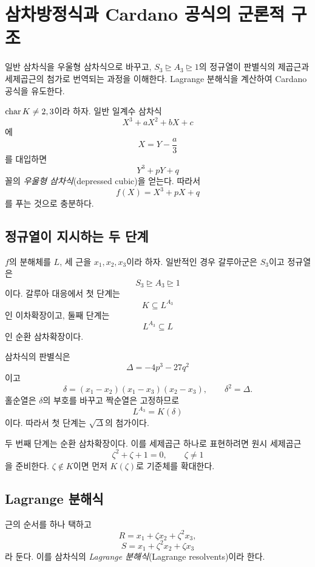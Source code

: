 \clearpage
\section{삼차방정식과 Cardano 공식의 군론적 구조}
\label{sec:cardano-galois-structure}

\begin{learninggoal}
일반 삼차식을 우울형 삼차식으로 바꾸고, $S_3\trianglerighteq A_3\trianglerighteq1$의 정규열이 판별식의 제곱근과 세제곱근의 첨가로 번역되는 과정을 이해한다. Lagrange 분해식을 계산하여 Cardano 공식을 유도한다.
\end{learninggoal}

$\operatorname{char} K\ne2,3$이라 하자. 일반 일계수 삼차식
\[
  X^3+aX^2+bX+c
\]
에
\[
  X=Y-\frac a3
\]
를 대입하면
\[
  Y^3+pY+q
\]
꼴의 \emph{우울형 삼차식}(depressed cubic)을 얻는다. 따라서
\[
  f(X)=X^3+pX+q
\]
를 푸는 것으로 충분하다.

\subsection{정규열이 지시하는 두 단계}

$f$의 분해체를 $L$, 세 근을 $x_1,x_2,x_3$이라 하자. 일반적인 경우 갈루아군은 $S_3$이고 정규열은
\[
  S_3\trianglerighteq A_3\trianglerighteq1
\]
이다. 갈루아 대응에서 첫 단계는
\[
  K\subseteq L^{A_3}
\]
인 이차확장이고, 둘째 단계는
\[
  L^{A_3}\subseteq L
\]
인 순환 삼차확장이다.

삼차식의 판별식은
\[
  \Delta=-4p^3-27q^2
\]
이고
\[
  \delta=(x_1-x_2)(x_1-x_3)(x_2-x_3),
  \qquad
  \delta^2=\Delta.
\]
홀순열은 $\delta$의 부호를 바꾸고 짝순열은 고정하므로
\[
  L^{A_3}=K(\delta)
\]
이다. 따라서 첫 단계는 $\sqrt\Delta$의 첨가이다.

두 번째 단계는 순환 삼차확장이다. 이를 세제곱근 하나로 표현하려면 원시 세제곱근
\[
  \zeta^2+\zeta+1=0,
  \qquad \zeta\ne1
\]
을 준비한다. $\zeta\notin K$이면 먼저 $K(\zeta)$로 기준체를 확대한다.

\subsection{Lagrange 분해식}

\begin{definition}
근의 순서를 하나 택하고
\[
  R=x_1+\zeta x_2+\zeta^2x_3,
\]
\[
  S=x_1+\zeta^2x_2+\zeta x_3
\]
라 둔다. 이를 삼차식의 \emph{Lagrange 분해식}(Lagrange resolvents)이라 한다.
\end{definition}

